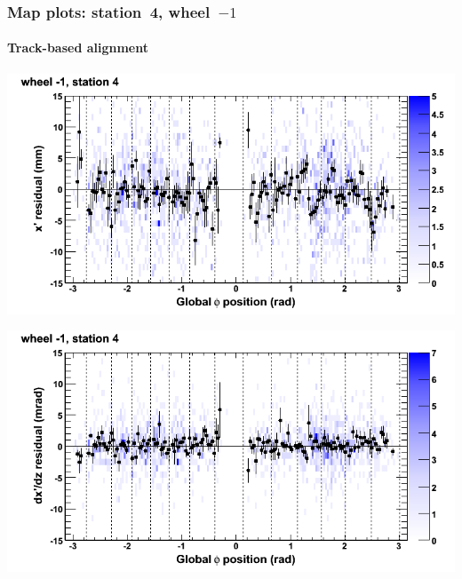 \documentclass[compress]{beamer}
\begin{document}
\begin{frame}
\frametitle{Map plots: station~4, wheel~$-1$}
\framesubtitle{Track-based alignment}
\includegraphics[width=0.5\linewidth]{mapplots_re05/DTvsphi_st4whB_x.png}

\includegraphics[width=0.5\linewidth]{mapplots_re05/DTvsphi_st4whB_dxdz.png}
\end{frame}
\end{document}
